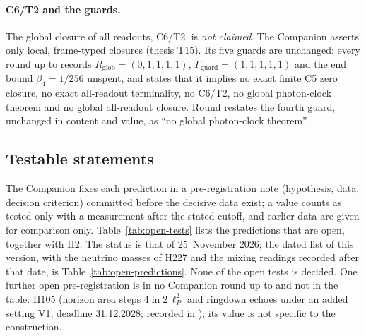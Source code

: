 \paragraph{C6/T2 and the guards.} The global closure of all readouts, C6/T2, is \emph{not claimed}. The Companion
asserts only local, frame-typed closures (thesis T15). Its five guards are unchanged: every round up to  records
$R_{\mathrm{glob}}=(0,1,1,1,1)$, $\Gamma_{\mathrm{guard}}=(1,1,1,1,1)$ and the end bound $\beta_4=1/256$ unspent, and states that it
implies no exact finite C5 zero closure, no exact all-readout terminality, no C6/T2, no global photon-clock theorem and no
global all-readout closure. Round  restates the fourth guard, unchanged in content and value, as ``no global photon-clock
theorem''.

\subsection{Testable statements}
\label{sec:open-tests}

The Companion fixes each prediction in a pre-registration note (hypothesis, data, decision criterion) committed before
the decisive data exist; a value counts as tested only with a measurement after the stated cutoff, and earlier data are
given for comparison only. Table~\ref{tab:open-tests} lists the predictions that are open, together with H2. The status is
that of 25~November 2026; the dated list of this version, with the neutrino masses of H227 and the mixing readings recorded after
that date, is Table~\ref{tab:open-predictions}. None of the open tests is decided. One further open pre-registration is in no Companion round up to
 and not in the table: H105 (horizon area steps $4\ln2\,\ell_P^2$ and ringdown echoes under an added setting V1,
deadline 31.12.2028; recorded in ); its value is not specific to the construction.


